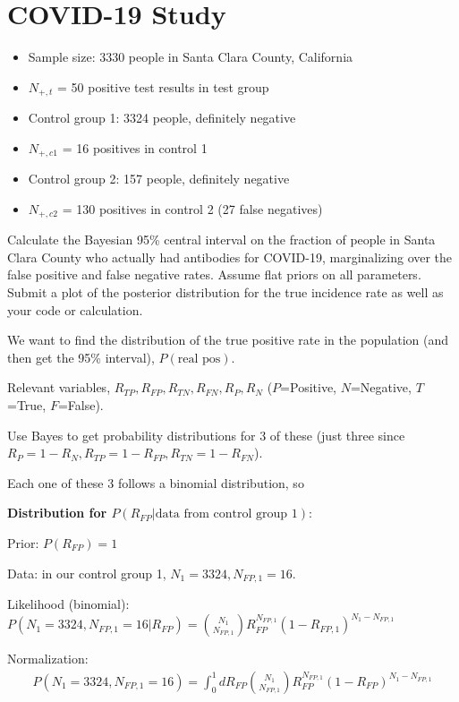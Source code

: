 \section{COVID-19 Study}
\begin{itemize}
    \item Sample size: 3330 people in Santa Clara County, California
    \item $N_{+,t}$ = 50 positive test results in test group
    \item Control group 1: 3324 people, definitely negative
    \item $N_{+,c1}$ = 16 positives in control 1
    \item Control group 2: 157 people, definitely negative
    \item $N_{+,c2}$ = 130 positives in control 2 (27 false negatives)
\end{itemize}

Calculate the Bayesian 95\% central interval on the fraction of people in Santa Clara County who actually had antibodies for COVID-19, marginalizing over the false positive and false negative rates. Assume flat priors on all parameters. Submit a plot of the posterior distribution for the true incidence rate as well as your code or calculation.

We want to find the distribution of the true positive rate in the population (and then get the 95\% interval), $P(\text{real pos})$.

Relevant variables, $R_{TP}, R_{FP}, R_{TN}, R_{FN}, R_P, R_N$ ($P$=Positive, $N$=Negative, $T$=True, $F$=False).

Use Bayes to get probability distributions for 3 of these (just three since $R_P = 1 - R_N, R_{TP} = 1 - R_{FP}, R_{TN} = 1 - R_{FN}$).

Each one of these 3 follows a binomial distribution, so

\textbf{Distribution for $P(R_{FP}|\text{data from control group 1})$}:

Prior: $P(R_{FP}) = 1$

Data: in our control group 1, $N_1 = 3324, N_{FP,1} = 16$.

Likelihood (binomial): $P(N_1=3324, N_{FP,1}=16 | R_{FP}) = {N_1 \choose N_{FP,1}} R_{FP}^{N_{FP,1}} (1-R_{FP,1})^{N_1-N_{FP,1}}$

Normalization:
\begin{align*}
    P(N_1=3324, N_{FP,1}=16) = \int_0^1 dR_{FP} {N_1 \choose N_{FP,1}} R_{FP}^{N_{FP,1}} (1-R_{FP})^{N_1-N_{FP,1}} \\
\end{align*}

